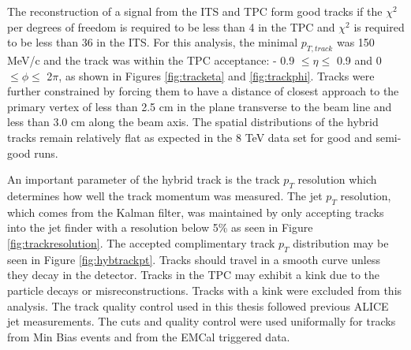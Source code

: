 The reconstruction of a signal from the ITS and TPC form good tracks if the $\chi^{2}$ per degrees of freedom is required to be less than 4 in the TPC and $\chi^{2}$ is required to be less than 36 in the ITS. For this analysis, the minimal $p_{T, track}$ was 150 MeV/c and the track was within the TPC acceptance: - 0.9 $\leq \eta \leq$ 0.9 and 0 $\leq \phi \leq$ 2$\pi$, as shown in Figures \ref{fig:tracketa} and \ref{fig:trackphi}. Tracks were further constrained by forcing them to have a distance of closest approach to the primary vertex of less than 2.5 cm in the plane transverse to the beam line and less than 3.0 cm along the beam axis.  The spatial distributions of the hybrid tracks remain relatively flat as expected in the 8 TeV data set for good and semi-good runs.



An important parameter of the hybrid track is the track $p_{T}$ resolution which determines how well the track momentum was measured.  The jet $p_{T}$ resolution, which comes from the Kalman filter, was maintained by only accepting tracks into the jet finder with a resolution below 5\% as seen in Figure \ref{fig:trackresolution}.  The accepted complimentary track $p_{T}$ distribution may be seen in Figure \ref{fig:hybtrackpt}.  Tracks should travel in a smooth curve unless they decay in the detector.  Tracks in the TPC may exhibit a kink due to the particle decays or misreconstructions.  Tracks with a kink were excluded from this analysis.  The track quality control used in this thesis followed previous ALICE jet measurements\cite{Acharya:2018eat}.  The cuts and quality control were used uniformally for tracks from Min Bias events and from the EMCal triggered data.



